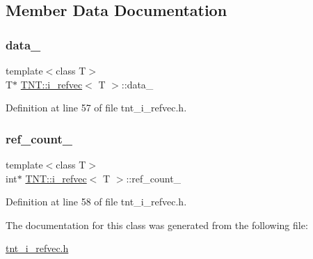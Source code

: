 \subsection{Member Data Documentation}
\mbox{\label{classTNT_1_1i__refvec_a1a6a387d48253f7781ce3b9c13adc9d0}} 
\subsubsection{\texorpdfstring{data\+\_\+}{data\_}}
{\footnotesize\ttfamily template$<$class T$>$ \\
T$\ast$ \hyperlink{classTNT_1_1i__refvec}{T\+N\+T\+::i\+\_\+refvec}$<$ T $>$\+::data\+\_\+\hspace{0.3cm}{\ttfamily [private]}}



Definition at line 57 of file tnt\+\_\+i\+\_\+refvec.\+h.

\mbox{\label{classTNT_1_1i__refvec_a639b7558a1a52403161d66730558015a}} 
\subsubsection{\texorpdfstring{ref\+\_\+count\+\_\+}{ref\_count\_}}
{\footnotesize\ttfamily template$<$class T$>$ \\
int$\ast$ \hyperlink{classTNT_1_1i__refvec}{T\+N\+T\+::i\+\_\+refvec}$<$ T $>$\+::ref\+\_\+count\+\_\+\hspace{0.3cm}{\ttfamily [private]}}



Definition at line 58 of file tnt\+\_\+i\+\_\+refvec.\+h.



The documentation for this class was generated from the following file\+:\begin{DoxyCompactItemize}
\item 
\hyperlink{tnt__i__refvec_8h}{tnt\+\_\+i\+\_\+refvec.\+h}\end{DoxyCompactItemize}
